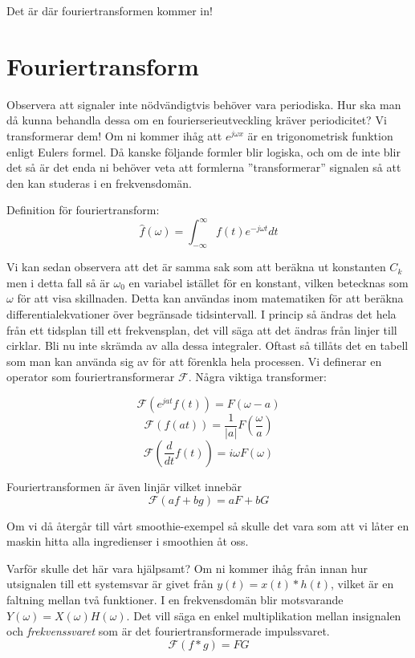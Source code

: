 \documentclass{article}
\begin{document}
Det är där fouriertransformen kommer in!

\section{Fouriertransform}

Observera att signaler inte nödvändigtvis behöver vara periodiska. Hur ska man då kunna behandla dessa om en fourierserieutveckling kräver periodicitet? Vi transformerar dem! Om ni kommer ihåg att $e^{j\omega x}$ är en trigonometrisk funktion enligt Eulers formel. Då kanske följande formler blir logiska, och om de inte blir det så är det enda ni behöver veta att formlerna ''transformerar'' signalen så att den kan studeras i en frekvensdomän.

Definition för fouriertransform:
\[\hat{f}(\omega) = \int_{-\infty}^{\infty} f(t) e^{-j \omega t} dt\]

Vi kan sedan observera att det är samma sak som att beräkna ut konstanten $C_k$ men i detta fall så är $\omega_0$ en variabel istället för en konstant, vilken betecknas som $\omega$ för att visa skillnaden. 
Detta kan användas inom matematiken för att beräkna differentialekvationer över begränsade tidsintervall. I princip så ändras det hela från ett tidsplan till ett frekvensplan, det vill säga att det ändras från linjer till cirklar. %
Bli nu inte skrämda av alla dessa integraler. Oftast så tillåts det en tabell som man kan använda sig av för att förenkla hela processen. Vi definerar en operator som fouriertransformerar $\mathcal{F}$. Några viktiga transformer:

\[\mathcal{F}(e^{j a t} f(t)) = F(\omega - a)\]%
\[\mathcal{F}(f(at)) = \frac{1}{|a|}F(\frac{\omega}{a})\]%
\[\mathcal{F}(\frac{d}{dt} f(t)) = i\omega F(\omega) \]%

Fouriertransformen är även linjär vilket innebär
\[\mathcal{F}(a f + b g) = a F + b G\]

Om vi då återgår till vårt smoothie-exempel så skulle det vara som att vi låter en maskin hitta alla ingredienser i smoothien åt oss.

Varför skulle det här vara hjälpsamt? Om ni kommer ihåg från innan hur utsignalen till ett systemsvar är givet från $y(t) = x(t) * h(t)$, vilket är en faltning mellan två funktioner. I en frekvensdomän blir motsvarande $Y(\omega) = X(\omega) H(\omega)$. Det vill säga en enkel multiplikation mellan insignalen och \emph{frekvenssvaret} som är det fouriertransformerade impulssvaret.
\[\mathcal{F}(f*g) = F G \]
\end{document}

